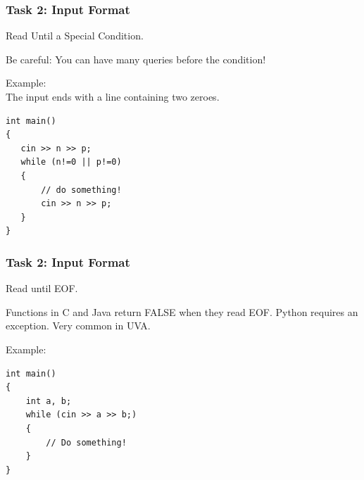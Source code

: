 \begin{frame}[fragile]
  \frametitle{Task 2: Input Format}
  \begin{block}{}
    Read Until a Special Condition.

    Be careful: You can have \alert{many} queries before the condition!
  \end{block}

  Example: \\
  The input ends with a line containing two zeroes.

{\smaller
\begin{verbatim}
int main()
{
   cin >> n >> p;
   while (n!=0 || p!=0)
   {
       // do something!
       cin >> n >> p;
   }
}
\end{verbatim}}
\end{frame}

\begin{frame}[fragile]
  \frametitle{Task 2: Input Format}
  \begin{block}{}
    Read until EOF.
    \bigskip

    Functions in C and Java return FALSE when they read EOF. Python requires
    an exception. Very common in UVA.
  \end{block}
  Example: 

{\smaller
\begin{verbatim}
int main()
{
    int a, b;
    while (cin >> a >> b;)
    {
        // Do something!
    }
}
\end{verbatim}
}
\end{frame}

